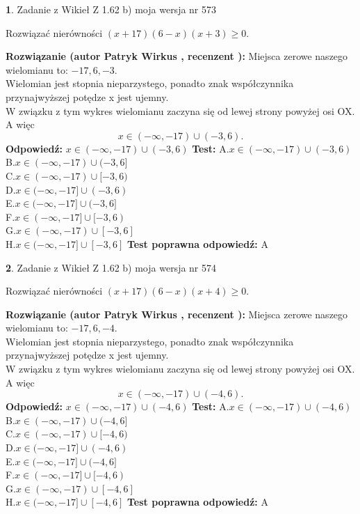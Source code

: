 \documentclass[12pt, a4paper]{article}
\theoremstyle{definition} %
\newtheorem{zad}{}
\newcommand{\zadStart}[1]{\begin{zad}#1\newline}
\newcommand{\zadStop}{\end{zad}}
\newcommand{\rozwStart}[2]{\noindent \textbf{Rozwiązanie (autor #1 , recenzent #2): }\newline}
\newcommand{\rozwStop}{\newline}
\newcommand{\odpStart}{\noindent \textbf{Odpowiedź:}\newline}
\newcommand{\odpStop}{\newline}
\newcommand{\testStart}{\noindent \textbf{Test:}\newline}
\newcommand{\testStop}{\newline}
\newcommand{\kluczStart}{\noindent \textbf{Test poprawna odpowiedź:}\newline}
\newcommand{\kluczStop}{\newline}
\begin{document}
\zadStart{Zadanie z Wikieł Z 1.62 b) moja wersja nr 573}

Rozwiązać nierówności $(x+17)(6-x)(x+3)\ge0$.
\zadStop
\rozwStart{Patryk Wirkus}{}
Miejsca zerowe naszego wielomianu to: $-17, 6, -3$.\\
Wielomian jest stopnia nieparzystego, ponadto znak współczynnika przy\linebreak najwyższej potędze x jest ujemny.\\ W związku z tym wykres wielomianu zaczyna się od lewej strony powyżej osi OX. A więc $$x \in (-\infty,-17) \cup (-3,6).$$
\rozwStop
\odpStart
$x \in (-\infty,-17) \cup (-3,6)$
\odpStop
\testStart
A.$x \in (-\infty,-17) \cup (-3,6)$\\
B.$x \in (-\infty,-17) \cup (-3,6]$\\
C.$x \in (-\infty,-17) \cup [-3,6)$\\
D.$x \in (-\infty,-17] \cup (-3,6)$\\
E.$x \in (-\infty,-17] \cup (-3,6]$\\
F.$x \in (-\infty,-17] \cup [-3,6)$\\
G.$x \in (-\infty,-17) \cup [-3,6]$\\
H.$x \in (-\infty,-17] \cup [-3,6]$
\testStop
\kluczStart
A
\kluczStop



\zadStart{Zadanie z Wikieł Z 1.62 b) moja wersja nr 574}

Rozwiązać nierówności $(x+17)(6-x)(x+4)\ge0$.
\zadStop
\rozwStart{Patryk Wirkus}{}
Miejsca zerowe naszego wielomianu to: $-17, 6, -4$.\\
Wielomian jest stopnia nieparzystego, ponadto znak współczynnika przy\linebreak najwyższej potędze x jest ujemny.\\ W związku z tym wykres wielomianu zaczyna się od lewej strony powyżej osi OX. A więc $$x \in (-\infty,-17) \cup (-4,6).$$
\rozwStop
\odpStart
$x \in (-\infty,-17) \cup (-4,6)$
\odpStop
\testStart
A.$x \in (-\infty,-17) \cup (-4,6)$\\
B.$x \in (-\infty,-17) \cup (-4,6]$\\
C.$x \in (-\infty,-17) \cup [-4,6)$\\
D.$x \in (-\infty,-17] \cup (-4,6)$\\
E.$x \in (-\infty,-17] \cup (-4,6]$\\
F.$x \in (-\infty,-17] \cup [-4,6)$\\
G.$x \in (-\infty,-17) \cup [-4,6]$\\
H.$x \in (-\infty,-17] \cup [-4,6]$
\testStop
\kluczStart
A
\kluczStop
\end{document}
